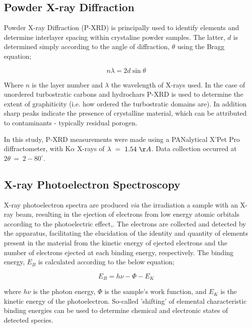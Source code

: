 \subsection{Powder X-ray Diffraction}

Powder X-ray Diffraction (P-XRD) is principally used to identify elements and determine interlayer spacing within crystaline powder samples. The latter, $d$ is determined simply according to the angle of diffraction, $\theta$ using the Bragg equation;

\begin{equation}
    n\lambda = 2 d \sin{\theta}
\end{equation}

Where $n$ is the layer number and $\lambda$ the wavelength of X-rays used.\citep{woolfson1997introduction} In the case of unordered turbostratic carbons and hydrochars P-XRD is used to determine the extent of graphiticity (i.e. how ordered the turbostratic domains are). In addition sharp peaks indicate the presence of crystalline material, which can be attributed to contaminants - typically residual porogen.

In this study, P-XRD measurements were made using a PANalytical X’Pet Pro diffractometer, with K$\alpha$ X-rays of $\lambda\ =\ 1.54\ \AA$. Data collection occurred at $2\theta\ =\ 2-80^{\circ}$.

\subsection{X-ray Photoelectron Spectroscopy}

X-ray photoelectron spectra are produced \textit{via} the irradiation a sample with an X-ray beam, resulting in the ejection of electrons from low energy atomic orbitals according to the photoelectric effect,\citep{richardson1912liii}. The electrons are collected and detected by the apparatus, facilitating the elucidation of the identity and quantity of elements present in the material from the kinetic energy of ejected electrons and the number of electrons ejected at each binding energy, respectively. The binding energy, $E_B$ is calculated according to the below equation;

\begin{equation}
    E_B = h\nu - \Phi - E_K
\end{equation}

where $h\nu$ is the photon energy, $\Phi$ is the sample’s work function, and $E_K$ is the kinetic energy of the photoelectron. So-called 'shifting' of elemental characteristic binding energies can be used to determine chemical and electronic states of detected species.\citep{moulder1995handbook}

